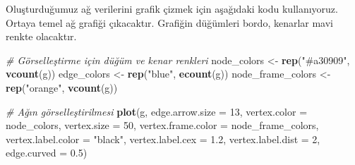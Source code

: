 \documentclass[
]{article}
\newenvironment{Shaded}{\begin{snugshade}}{\end{snugshade}}
\newcommand{\AttributeTok}[1]{\textcolor[rgb]{0.13,0.29,0.53}{#1}}
\newcommand{\CommentTok}[1]{\textcolor[rgb]{0.56,0.35,0.01}{\textit{#1}}}
\newcommand{\ConstantTok}[1]{\textcolor[rgb]{0.56,0.35,0.01}{#1}}
\newcommand{\DecValTok}[1]{\textcolor[rgb]{0.00,0.00,0.81}{#1}}
\newcommand{\FloatTok}[1]{\textcolor[rgb]{0.00,0.00,0.81}{#1}}
\newcommand{\FunctionTok}[1]{\textcolor[rgb]{0.13,0.29,0.53}{\textbf{#1}}}
\newcommand{\NormalTok}[1]{#1}
\newcommand{\OtherTok}[1]{\textcolor[rgb]{0.56,0.35,0.01}{#1}}
\newcommand{\SpecialCharTok}[1]{\textcolor[rgb]{0.81,0.36,0.00}{\textbf{#1}}}
\newcommand{\StringTok}[1]{\textcolor[rgb]{0.31,0.60,0.02}{#1}}
\begin{document}
\begin{Shaded}
\end{Shaded}

Oluşturduğumuz ağ verilerini grafik çizmek için aşağıdaki kodu
kullanıyoruz. Ortaya temel ağ grafiği çıkacaktır. Grafiğin düğümleri
bordo, kenarlar mavi renkte olacaktır.

\begin{Shaded}
\begin{Highlighting}[]
\CommentTok{\# Görselleştirme için düğüm ve kenar renkleri}
\NormalTok{node\_colors }\OtherTok{\textless{}{-}} \FunctionTok{rep}\NormalTok{(}\StringTok{"\#a30909"}\NormalTok{, }\FunctionTok{vcount}\NormalTok{(g))  }
\NormalTok{edge\_colors }\OtherTok{\textless{}{-}} \FunctionTok{rep}\NormalTok{(}\StringTok{"blue"}\NormalTok{, }\FunctionTok{ecount}\NormalTok{(g))  }
\NormalTok{node\_frame\_colors }\OtherTok{\textless{}{-}} \FunctionTok{rep}\NormalTok{(}\StringTok{"orange"}\NormalTok{, }\FunctionTok{vcount}\NormalTok{(g))  }

\CommentTok{\# Ağın görselleştirilmesi}
\FunctionTok{plot}\NormalTok{(g, }\AttributeTok{edge.arrow.size =} \DecValTok{13}\NormalTok{, }\AttributeTok{vertex.color =}\NormalTok{ node\_colors, }\AttributeTok{vertex.size =} \DecValTok{50}\NormalTok{, }
     \AttributeTok{vertex.frame.color =}\NormalTok{ node\_frame\_colors, }\AttributeTok{vertex.label.color =} \StringTok{"black"}\NormalTok{, }
     \AttributeTok{vertex.label.cex =} \FloatTok{1.2}\NormalTok{, }\AttributeTok{vertex.label.dist =} \DecValTok{2}\NormalTok{, }\AttributeTok{edge.curved =} \FloatTok{0.5}\NormalTok{)}
\end{Highlighting}
\end{Shaded}
\end{document}
